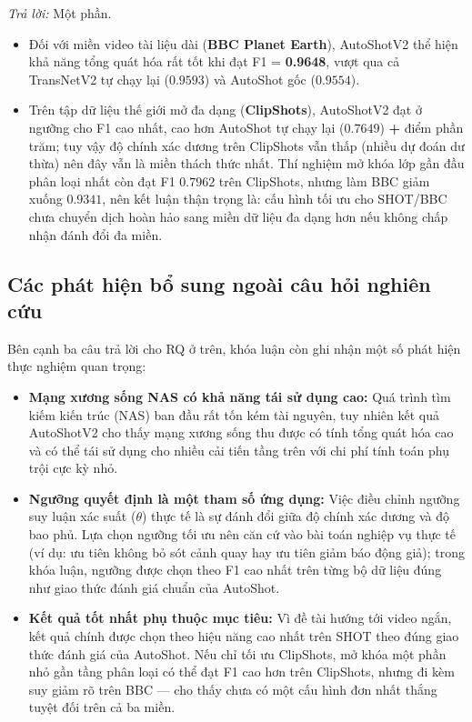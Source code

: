 \begin{itemize}
    \textit{Trả lời:} Một phần. 
    \begin{itemize}
        \item Đối với miền video tài liệu dài (\textbf{BBC Planet Earth}), AutoShotV2 thể hiện khả năng tổng quát hóa rất tốt khi đạt F1 = \textbf{0.9648}, vượt qua cả TransNetV2 tự chạy lại ($0.9593$) và AutoShot gốc ($0.9554$).
        \item Trên tập dữ liệu thế giới mở đa dạng (\textbf{ClipShots}), AutoShotV2 đạt \textbf{\ASVTwoBestClipFOne{}} ở ngưỡng cho F1 cao nhất, cao hơn AutoShot tự chạy lại ($0.7649$) \textbf{+\ASVTwoBestVsAutoShotClipPP{}} điểm phần trăm; tuy vậy độ chính xác dương trên ClipShots vẫn thấp (nhiều dự đoán dư thừa) nên đây vẫn là miền thách thức nhất. Thí nghiệm mở khóa lớp gần đầu phân loại nhất còn đạt F1 $0.7962$ trên ClipShots, nhưng làm BBC giảm xuống $0.9341$, nên kết luận thận trọng là: cấu hình tối ưu cho SHOT/BBC chưa chuyển dịch hoàn hảo sang miền dữ liệu đa dạng hơn nếu không chấp nhận đánh đổi đa miền.
    \end{itemize}
\end{itemize}

\subsection{Các phát hiện bổ sung ngoài câu hỏi nghiên cứu}
Bên cạnh ba câu trả lời cho RQ ở trên, khóa luận còn ghi nhận một số phát hiện thực nghiệm quan trọng:
\begin{itemize}
    \item \textbf{Mạng xương sống NAS có khả năng tái sử dụng cao:} Quá trình tìm kiếm kiến trúc (NAS) ban đầu rất tốn kém tài nguyên, tuy nhiên kết quả AutoShotV2 cho thấy mạng xương sống thu được có tính tổng quát hóa cao và có thể tái sử dụng cho nhiều cải tiến tầng trên với chi phí tính toán phụ trội cực kỳ nhỏ.
    \item \textbf{Ngưỡng quyết định là một tham số ứng dụng:} Việc điều chỉnh ngưỡng suy luận xác suất ($\theta$) thực tế là sự đánh đổi giữa độ chính xác dương và độ bao phủ. Lựa chọn ngưỡng tối ưu nên căn cứ vào bài toán nghiệp vụ thực tế (ví dụ: ưu tiên không bỏ sót cảnh quay hay ưu tiên giảm báo động giả); trong khóa luận, ngưỡng được chọn theo F1 cao nhất trên từng bộ dữ liệu đúng như giao thức đánh giá chuẩn của AutoShot.
    \item \textbf{Kết quả tốt nhất phụ thuộc mục tiêu:} Vì đề tài hướng tới video ngắn, kết quả chính được chọn theo hiệu năng cao nhất trên SHOT theo đúng giao thức đánh giá của AutoShot. Nếu chỉ tối ưu ClipShots, mở khóa một phần nhỏ gần tầng phân loại có thể đạt F1 cao hơn trên ClipShots, nhưng đi kèm suy giảm rõ trên BBC --- cho thấy chưa có một cấu hình đơn nhất thắng tuyệt đối trên cả ba miền.
\end{itemize}

